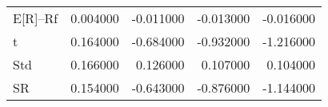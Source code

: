 \begin{tabular}{lrrrr}
\toprule
\midrule
E[R]--Rf & 0.004000 & -0.011000 & -0.013000 & -0.016000 \\
t & 0.164000 & -0.684000 & -0.932000 & -1.216000 \\
Std & 0.166000 & 0.126000 & 0.107000 & 0.104000 \\
SR & 0.154000 & -0.643000 & -0.876000 & -1.144000 \\
\bottomrule
\end{tabular}
